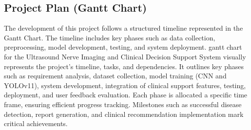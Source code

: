 \documentclass[12pt]{article}
\begin{document}
\vspace{10pt}

\newpage

\subsection{Project Plan (Gantt Chart)}

\vspace{10pt}

\renewcommand{\thefigure}{4.2.\arabic{figure}}
\setcounter{figure}{0} %
The development of this project follows a structured timeline represented in the Gantt Chart. The timeline includes key phases such as data collection, preprocessing, model development, testing, and system deployment. gantt chart for the Ultrasound Nerve Imaging and Clinical Decision Support System visually represents the project's timeline, tasks, and dependencies. It outlines key phases such as requirement analysis, dataset collection, model training (CNN and YOLOv11), system development, integration of clinical support features, testing, deployment, and user feedback evaluation. Each phase is allocated a specific time frame, ensuring efficient progress tracking. Milestones such as successful disease detection, report generation, and clinical recommendation implementation mark critical achievements.
\end{document}
